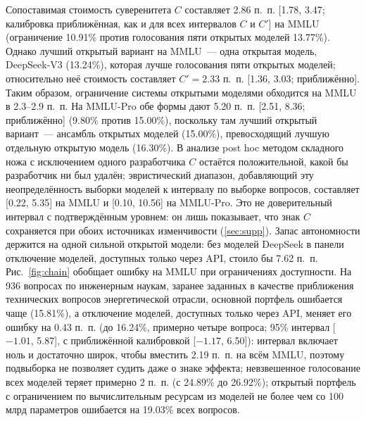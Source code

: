 \documentclass[preprint,12pt,authoryear]{elsarticle}
\begin{document}
Сопоставимая стоимость суверенитета $C$ составляет 2.86 п.~п. [1.78, 3.47; калибровка приближённая, как и для всех интервалов $C$ и $C'$] на MMLU (ограничение 10.91\% против голосования пяти открытых моделей 13.77\%). Однако лучший открытый вариант на MMLU~--- одна открытая модель, DeepSeek-V3 (13.24\%), которая лучше голосования пяти открытых моделей; относительно неё стоимость составляет $C' = 2.33$ п.~п. [1.36, 3.03; приближённо]. Таким образом, ограничение системы открытыми моделями обходится на MMLU в 2.3--2.9 п.~п. На MMLU-Pro обе формы дают 5.20 п.~п. [2.51, 8.36; приближённо] (9.80\% против 15.00\%), поскольку там лучший открытый вариант~--- ансамбль открытых моделей (15.00\%), превосходящий лучшую отдельную открытую модель (16.30\%). В анализе post hoc методом складного ножа с исключением одного разработчика $C$ остаётся положительной, какой бы разработчик ни был удалён; эвристический диапазон, добавляющий эту неопределённость выборки моделей к интервалу по выборке вопросов, составляет [0.22, 5.35] на MMLU и [0.10, 10.56] на MMLU-Pro. Это не доверительный интервал с подтверждённым уровнем: он лишь показывает, что знак $C$ сохраняется при обоих источниках изменчивости (\ref{sec:supp}). Запас автономности держится на одной сильной открытой модели: без моделей DeepSeek в панели отключение моделей, доступных только через API, стоило бы 7.62 п.~п. Рис.~\ref{fig:chain} обобщает ошибку на MMLU при ограничениях доступности. На 936 вопросах по инженерным наукам, заранее заданных в качестве приближения технических вопросов энергетической отрасли, основной портфель ошибается чаще (15.81\%), а отключение моделей, доступных только через API, меняет его ошибку на 0.43 п.~п. (до 16.24\%, примерно четыре вопроса; 95\% интервал [$-1.01$, 5.87], с приближённой калибровкой [$-1.17$, 6.50]): интервал включает ноль и достаточно широк, чтобы вместить 2.19 п.~п. на всём MMLU, поэтому подвыборка не позволяет судить даже о знаке эффекта; невзвешенное голосование всех моделей теряет примерно 2 п.~п. (с 24.89\% до 26.92\%); открытый портфель с ограничением по вычислительным ресурсам из моделей не более чем со 100 млрд параметров ошибается на 19.03\% всех вопросов.
\end{document}
